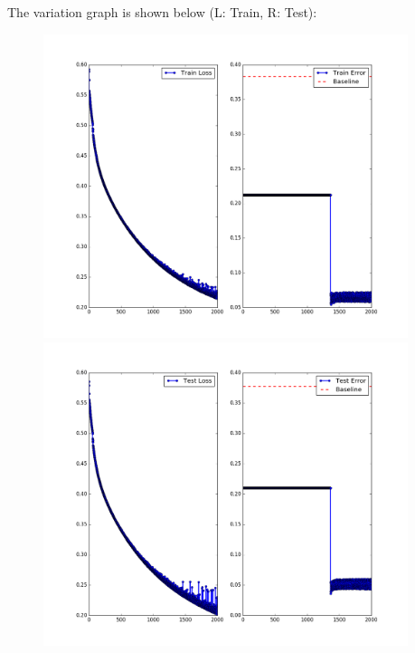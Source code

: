 \documentclass{article}
\begin{document}
\begin{flushleft}
The variation graph is shown below (L: Train, R: Test):
\begin{figure}[H]
\begin{minipage}{0.49\linewidth}
\centering
\includegraphics[width=0.95\textwidth]{Train-Statistics-sgd-batchsize=8143-bce.png}
\end{minipage}
\hfill
\begin{minipage}{0.49\linewidth}
\centering
\includegraphics[width=0.95\textwidth]{Test-Statistics-sgd-batchsize=8143-bce.png}
\end{minipage}
\end{figure}
\end{flushleft}
\end{document}
